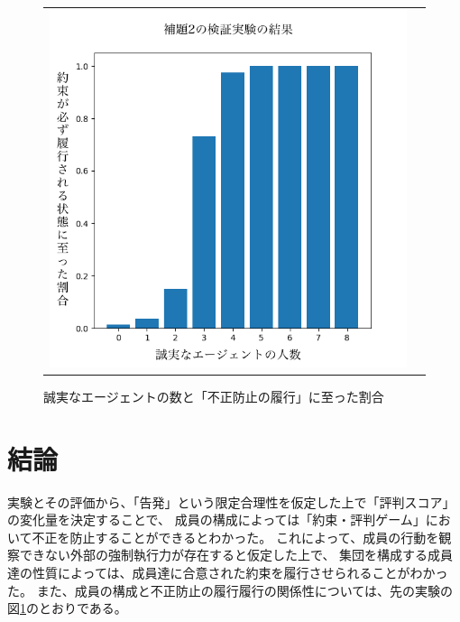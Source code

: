 \begin{figure}[h]
  \begin{tabular}{cc}
    \begin{minipage}[t]{1\hsize}
      \centering
      \includegraphics[keepaspectratio, width=1\linewidth]{./06_ethical-prgame/figure01.png}
      \caption{誠実なエージェントの数と「不正防止の履行」に至った割合}
      \label{ethical-game-001}
    \end{minipage}
  \end{tabular}
\end{figure}

\section{結論}
実験とその評価から、「告発」という限定合理性を仮定した上で「評判スコア」の変化量を決定することで、
成員の構成によっては「約束・評判ゲーム」において不正を防止することができるとわかった。
これによって、成員の行動を観察できない外部の強制執行力が存在すると仮定した上で、
集団を構成する成員達の性質によっては、成員達に合意された約束を履行させられることがわかった。
また、成員の構成と不正防止の履行履行の関係性については、先の実験の図\ref{ethical-game-001}のとおりである。
